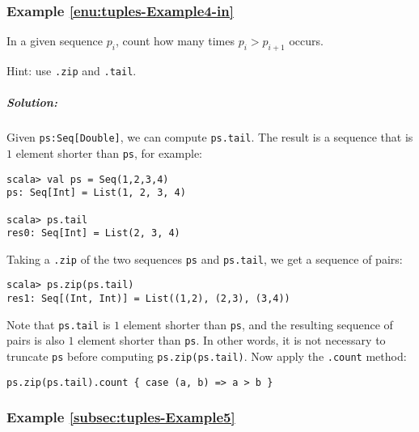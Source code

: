\subsubsection{Example \label{enu:tuples-Example4-in}\ref{enu:tuples-Example4-in}}

In a given sequence $p_{i}$, count how many times $p_{i}>p_{i+1}$
occurs.

Hint: use \lstinline!.zip!
and \lstinline!.tail!.

\subparagraph{Solution:}

Given \lstinline!ps:Seq[Double]!,
we can compute \lstinline!ps.tail!.
The result is a sequence that is $1$ element shorter than \lstinline!ps!,
for example:
\begin{lstlisting}
scala> val ps = Seq(1,2,3,4)
ps: Seq[Int] = List(1, 2, 3, 4)

scala> ps.tail
res0: Seq[Int] = List(2, 3, 4)
\end{lstlisting}
Taking a \lstinline!.zip!
of the two sequences \lstinline!ps!
and \lstinline!ps.tail!,
we get a sequence of pairs:
\begin{lstlisting}
scala> ps.zip(ps.tail)
res1: Seq[(Int, Int)] = List((1,2), (2,3), (3,4))
\end{lstlisting}
Note that \lstinline!ps.tail!
is $1$ element shorter than \lstinline!ps!,
and the resulting sequence of pairs is also $1$ element shorter than
\lstinline!ps!. In other
words, it is not necessary to truncate \lstinline!ps!
before computing \lstinline!ps.zip(ps.tail)!.
Now apply the \lstinline!.count!
method:

\begin{lstlisting}
ps.zip(ps.tail).count { case (a, b) => a > b }
\end{lstlisting}

\subsubsection{Example \label{subsec:tuples-Example5}\ref{subsec:tuples-Example5}}

